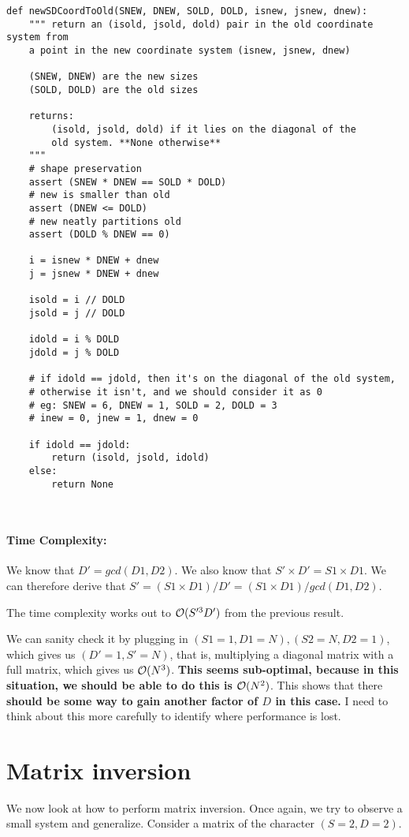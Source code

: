 \documentclass[11pt]{article}
\begin{document}
\begin{verbatim}
def newSDCoordToOld(SNEW, DNEW, SOLD, DOLD, isnew, jsnew, dnew):
    """ return an (isold, jsold, dold) pair in the old coordinate system from 
    a point in the new coordinate system (isnew, jsnew, dnew)

    (SNEW, DNEW) are the new sizes
    (SOLD, DOLD) are the old sizes

    returns:
        (isold, jsold, dold) if it lies on the diagonal of the
        old system. **None otherwise**
    """
    # shape preservation
    assert (SNEW * DNEW == SOLD * DOLD)
    # new is smaller than old
    assert (DNEW <= DOLD)
    # new neatly partitions old
    assert (DOLD % DNEW == 0)

    i = isnew * DNEW + dnew
    j = jsnew * DNEW + dnew

    isold = i // DOLD
    jsold = j // DOLD

    idold = i % DOLD
    jdold = j % DOLD

    # if idold == jdold, then it's on the diagonal of the old system,
    # otherwise it isn't, and we should consider it as 0
    # eg: SNEW = 6, DNEW = 1, SOLD = 2, DOLD = 3
    # inew = 0, jnew = 1, dnew = 0
    
    if idold == jdold:
        return (isold, jsold, idold)
    else:
        return None



\end{verbatim}
\paragraph{\textbf{Time Complexity:}}
We know that $D' = gcd(D1, D2)$. We also know that $S' \times D' = S1 \times D1$.
We can therefore derive that $S' = (S1 \times D1) / D' = (S1 \times D1) / gcd(D1, D2)$.

The time complexity works out to $\mathcal{O}(S'^3 D')$ from the previous result.

We can sanity check it by plugging in $(S1 = 1, D1 = N), (S2 = N, D2 = 1)$, which gives us
$(D' = 1, S' = N)$, that is, multiplying a diagonal matrix with a full matrix,
which gives us  $\mathcal{O}(N^3)$.
\textbf{This seems sub-optimal, because in this situation, we should be able to do
this is $\mathcal{O}(N^2)$}. This shows that there \textbf{should be some way to gain another
factor of $D$ in this case.} I need to think about this more carefully
to identify where performance is lost.


\section{Matrix inversion}
We now look at how to perform matrix inversion. Once again, we try to observe
a small system and generalize. Consider a matrix of the character $(S = 2, D = 2)$.
\end{document}
